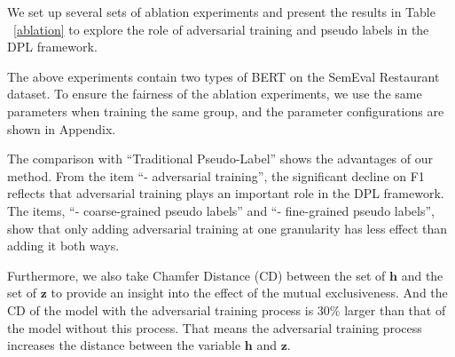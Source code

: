 \documentclass[11pt]{article}
\newcommand{\bz}{\mathbf{z}}
\newcommand{\bh}{\mathbf{h}}
\begin{document}
We set up several sets of ablation experiments and present the results in Table ~\ref{ablation} to explore the role of adversarial training and pseudo labels in the DPL framework.

The above experiments contain two types of BERT on the SemEval Restaurant dataset. To ensure the fairness of the ablation experiments, we use the same parameters when training the same group, and the parameter configurations are shown in Appendix.

The comparison with ``Traditional Pseudo-Label'' shows the advantages of our method.
From the item ``- adversarial training'', the significant decline on F1 reflects that adversarial training plays an important role in the DPL framework. 
The items, ``- coarse-grained pseudo labels'' and ``- fine-grained pseudo labels'', show that only adding adversarial training at one granularity has less effect than adding it both ways.

Furthermore, we also take Chamfer Distance (CD) between the set of $\bh$ and the set of $\bz$ to provide an insight into the effect of the mutual exclusiveness. 
And the CD of the model with the adversarial training process is 30\% larger than that of the model without this process.
That means the adversarial training process increases the distance between the variable $\bh$ and $\bz$.
\end{document}

